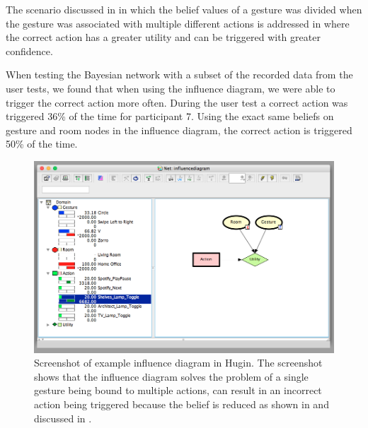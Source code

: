 The scenario discussed in  in which the belief values of a gesture was divided when the gesture was associated with multiple different actions is addressed in  where the correct action has a greater utility and can be triggered with greater confidence.

When testing the Bayesian network with a subset of the recorded data from the user tests, we found that when using the influence diagram, we were able to trigger the correct action more often. During the user test a correct action was triggered 36\% of the time for participant 7. Using the exact same beliefs on gesture and room nodes in the influence diagram, the correct action is triggered 50\% of the time.


\begin{figure}[h]
\centering
\includegraphics[width=\textwidth]{images/hugin-influence-diagram}
\caption{Screenshot of example influence diagram in Hugin. The screenshot shows that the influence diagram solves the problem of a single gesture being bound to multiple actions, can result in an incorrect action being triggered because the belief is reduced as shown in  and discussed in .}
\label{fig:evaluation:alternative-models:hugin-influence-diagram}
\end{figure}

